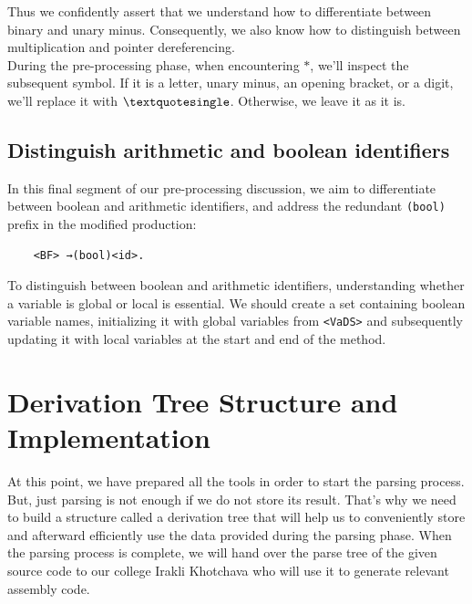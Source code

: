 Thus we confidently assert that we understand how to differentiate between binary and unary minus. Consequently, we also know how to distinguish between multiplication and pointer dereferencing.\\

During the pre-processing phase, when encountering \(\ast\), we'll inspect the subsequent symbol. If it is a letter, unary minus, an opening bracket, or a digit, we'll replace it with \(\textquotesingle\). Otherwise, we leave it as it is.

\vspace{30pt}

\subsection{Distinguish arithmetic and boolean identifiers}

In this final segment of our pre-processing discussion, we aim to differentiate between boolean and arithmetic identifiers, and address the redundant \texttt{(bool)} prefix in the modified production:

\begin{verbatim}
    <BF> →(bool)<id>.
\end{verbatim}

To distinguish between boolean and arithmetic identifiers, understanding whether a variable is global or local is essential. We should create a set containing boolean variable names, initializing it with global variables from \texttt{<VaDS>} and subsequently updating it with local variables at the start and end of the method.

\newpage


\section{Derivation Tree Structure and Implementation}\label{sec:Derivation Tree Structure and Implementation}

At this point, we have prepared all the tools in order to start the parsing process. But, just parsing is not enough if we do not store its result. That’s why we need to build a structure called a derivation tree that will help us to conveniently store and afterward efficiently use the data provided during the parsing phase. When the parsing process is complete, we will hand over the parse tree of the given source code to our college Irakli Khotchava who will use it to generate relevant assembly code.

